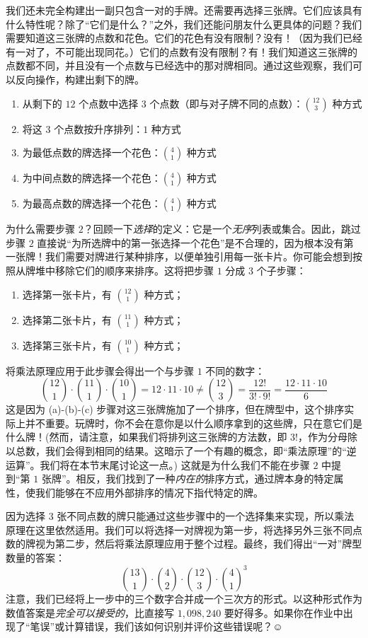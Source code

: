 \begin{example}[一对]
    我们还未完全构建出一副只包含一对的手牌。还需要再选择三张牌。它们应该具有什么特性呢？除了``它们是什么？''之外，我们还能问朋友什么更具体的问题？我们需要知道这三张牌的点数和花色。它们的花色有没有限制？没有！（因为我们已经有一对了，不可能出现同花。）它们的点数有没有限制？有！我们知道这三张牌的点数都不同，并且没有一个点数与已经选中的那对牌相同。通过这些观察，我们可以反向操作，构建出剩下的牌。
    \begin{enumerate}
        \item 从剩下的 $12$ 个点数中选择 $3$ 个点数（即与对子牌不同的点数）：${12 \choose 3}$ 种方式
        \item 将这 $3$ 个点数按升序排列：$1$ 种方式
        \item 为最低点数的牌选择一个花色：${4 \choose 1}$ 种方式
        \item 为中间点数的牌选择一个花色：${4 \choose 1}$ 种方式
        \item 为最高点数的牌选择一个花色：${4 \choose 1}$ 种方式
    \end{enumerate}
    为什么需要步骤 $2$？回顾一下\emph{选择}的定义：它是一个\emph{无序}列表或集合。因此，跳过步骤 $2$ 直接说``为所选牌中的第一张选择一个花色''是不合理的，因为根本没有第一张牌！我们需要对牌进行某种排序，以便单独引用每一张卡片。你可能会想到按照从牌堆中移除它们的顺序来排序。这将把步骤 $1$ 分成 $3$ 个子步骤：
    \begin{enumerate}[label=(\alph*)]
        \item 选择第一张卡片，有 ${12 \choose 1}$ 种方式；
        \item 选择第二张卡片，有 ${11 \choose 1}$ 种方式；
        \item 选择第三张卡片，有 ${10 \choose 1}$ 种方式；
    \end{enumerate}
    将乘法原理应用于此步骤会得出一个与步骤 $1$ 不同的数字：
    \[{12 \choose 1} \cdot {11 \choose 1} \cdot {10 \choose 1} = 12 \cdot 11 \cdot 10 \ne {12 \choose 3} = \frac{12!}{3! \cdot 9!} = \frac{12 \cdot 11 \cdot 10}{6}\]
    这是因为 (a)-(b)-(c) 步骤对这三张牌施加了一个排序，但在牌型中，这个排序实际上并不重要。玩牌时，你不会在意你是以什么顺序拿到的这些牌，只在意它们是什么牌！(然而，请注意，如果我们将排列这三张牌的方法数，即 $3!$，作为分母除以总数，我们会得到相同的结果。这暗示了一个有趣的概念，即``乘法原理''的``逆运算''。我们将在本节末尾讨论这一点。) 这就是为什么我们不能在步骤 $2$ 中提到``第 $1$ 张牌''。相反，我们找到了一种\emph{内在的}排序方式，通过牌本身的特定属性，使我们能够在不应用外部排序的情况下指代特定的牌。

    因为选择 $3$ 张不同点数的牌只能通过这些步骤中的一个选择集来实现，所以乘法原理在这里依然适用。我们可以将选择一对牌视为第一步，将选择另外三张不同点数的牌视为第二步，然后将乘法原理应用于整个过程。最终，我们得出``一对''牌型数量的答案：
    \[{13 \choose 1} \cdot {4 \choose 2} \cdot {12 \choose 3} \cdot {4 \choose 1}^3\]
    注意，我们已经将上一步中的三个数字合并成一个三次方的形式。以这种形式作为数值答案是\emph{完全可以接受的}，比直接写 $1,098,240$ 要好得多。如果你在作业中出现了``笔误''或计算错误，我们该如何识别并评价这些错误呢？$\smiley{}$


\end{example}
